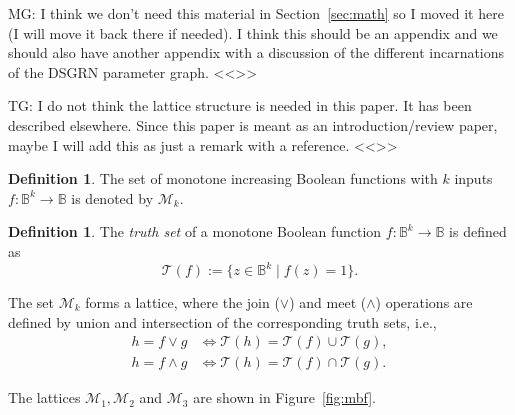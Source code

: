 \documentclass[12pt, notitlepage]{amsart}
\newcommand{\cM}{{\mathcal M}}
\newcommand{\cT}{{\mathcal T}}
\theoremstyle{definition}
\newtheorem{defn}[thm]{Definition}
\newcommand{\bbB}{\mathbb{B}}
\begin{document}
    \corrc MG: I think we don't need this material in Section~\ref{sec:math} so I moved it here (I will move it back there if needed). I think this should be an appendix and we should also have another appendix with a discussion of the different incarnations of the DSGRN parameter graph.
    <<>>

    \corrc TG: I do not think the lattice structure is needed in this paper. It has been described elsewhere.
    Since this paper is meant as an introduction/review paper, maybe I will add this as just a remark with a reference.
    <<>>

    \begin{defn}
      The set of monotone increasing Boolean functions with $k$ inputs $f \colon \bbB^k \to \bbB$ is denoted by $\cM_k$.
    \end{defn}

    \begin{defn}
      The \emph{truth set} of a monotone Boolean function $f \colon \bbB^k \to \bbB$ is defined as
      \[
        \cT(f) :=\{ z \in \bbB^k \;|\; f(z) =1 \}.
      \]
    \end{defn}

    The set $\cM_k$ forms a lattice, where the join ($\vee$) and meet ($\wedge$) operations are defined by union and intersection of the corresponding truth sets, i.e.,
    \begin{align*}
      h = f \vee g   & \iff \cT(h) = \cT(f) \cup \cT(g), \\
      h = f \wedge g & \iff \cT(h) = \cT(f) \cap \cT(g).
    \end{align*}

    The lattices $\cM_1, \cM_2$ and $\cM_3$ are shown in Figure~\ref{fig:mbf}.
\end{document}
